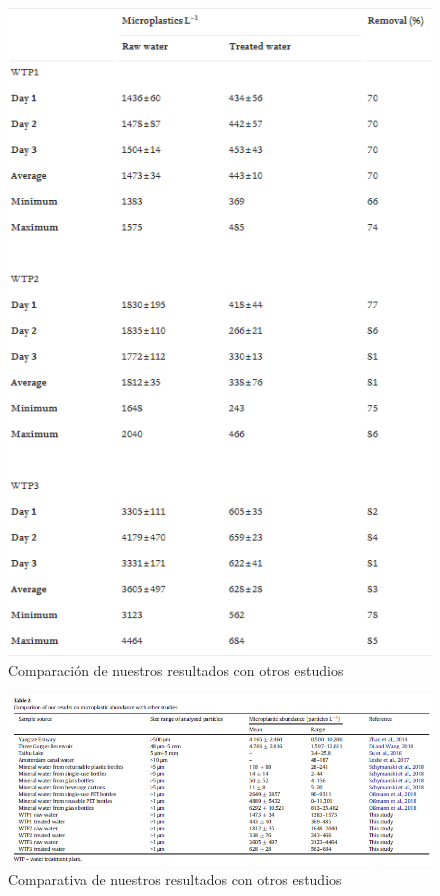 \documentclass[a4paper,11pt]{article}
\begin{document}
	\begin{figure}[h!]
		\centering
		\includegraphics[scale=0.5]{tabla.png}
		\caption{Comparación de nuestros resultados con otros estudios}
	\end{figure}
	\begin{figure}[h]
		\centering
		\includegraphics[scale=0.5]{tabla2.png}
		\caption{Comparativa de nuestros resultados con otros estudios}
		\label{tabla2}
		
	\end{figure}
\end{document}
